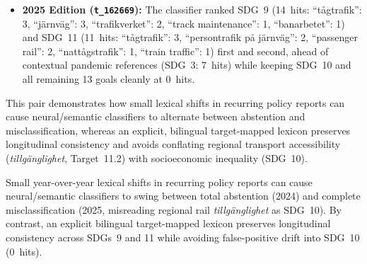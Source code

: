 \begin{casestudySection}
\begin{itemize}
  \item \textbf{2025 Edition (\texttt{t\_162669}):} The classifier ranked \gls{SDG}~9 (\num{14}~hits: \enquote{\foreignlanguage{swedish}{tågtrafik}}: 3, \enquote{\foreignlanguage{swedish}{järnväg}}: 3, \enquote{\foreignlanguage{swedish}{trafikverket}}: 2, \enquote{track maintenance}: 1, \enquote{\foreignlanguage{swedish}{banarbetet}}: 1) and \gls{SDG}~11 (\num{11}~hits: \enquote{\foreignlanguage{swedish}{tågtrafik}}: 3, \enquote{\foreignlanguage{swedish}{persontrafik på järnväg}}: 2, \enquote{passenger rail}: 2, \enquote{\foreignlanguage{swedish}{nattågstrafik}}: 1, \enquote{train traffic}: 1) first and second, ahead of contextual pandemic references (\gls{SDG}~3: \num{7}~hits) while keeping \gls{SDG}~10 and all remaining \num{13} goals cleanly at \num{0}~hits.
\end{itemize}

This pair demonstrates how small lexical shifts in recurring policy reports can cause neural/semantic classifiers to alternate between abstention and misclassification, whereas an explicit, bilingual target-mapped lexicon preserves longitudinal consistency and avoids conflating regional transport accessibility (\emph{\foreignlanguage{swedish}{tillgänglighet}}, Target~11.2) with socioeconomic inequality (\gls{SDG}~10).
\end{casestudySection}

\begin{takeaway}
Small year-over-year lexical shifts in recurring policy reports can cause neural/semantic classifiers to swing between total abstention (2024) and complete misclassification (2025, misreading regional rail \emph{\foreignlanguage{swedish}{tillgänglighet}} as \gls{SDG}~10). By contrast, an explicit bilingual target-mapped lexicon preserves longitudinal consistency across \glspl{SDG}~9 and 11 while avoiding false-positive drift into \gls{SDG}~10 (\num{0}~hits).
\end{takeaway}

